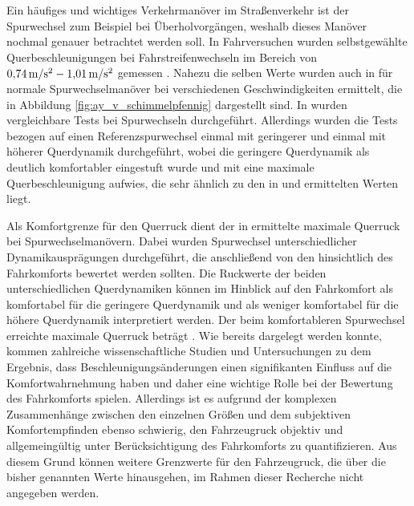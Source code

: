 Ein häufiges und wichtiges Verkehrmanöver im Straßenverkehr ist der Spurwechsel zum Beispiel bei Überholvorgängen, weshalb dieses Manöver nochmal genauer betrachtet werden soll. In Fahrversuchen wurden selbstgewählte Querbeschleunigungen bei Fahrstreifenwechseln im Bereich von $0{,}74\,\mathrm{m/s^2}-1{,}01\,\mathrm{m/s^2}$ gemessen \cite{Lange.2014}. Nahezu die selben Werte wurden auch in \cite{Schimmelpfennig.1985} für normale Spurwechselmanöver bei verschiedenen Geschwindigkeiten ermittelt, die in Abbildung \ref{fig:ay_v_schimmelpfennig} dargestellt sind. In \cite{WorkshopAssistenzsystemeFestner.2017} wurden vergleichbare Tests bei Spurwechseln durchgeführt. Allerdings wurden die Tests bezogen auf einen Referenzspurwechsel einmal mit geringerer und einmal mit höherer Querdynamik durchgeführt, wobei die geringere Querdynamik als deutlich komfortabler eingestuft wurde \cite{WorkshopAssistenzsystemeFestner.2017} und mit  eine maximale Querbeschleunigung aufwies, die sehr ähnlich zu den in \cite{Schimmelpfennig.1985} und \cite{Lange.2014} ermittelten Werten liegt. 

Als Komfortgrenze für den Querruck dient der in \cite{WorkshopAssistenzsystemeFestner.2017} ermittelte maximale Querruck bei Spurwechselmanövern. Dabei wurden Spurwechsel unterschiedlicher Dynamikausprägungen durchgeführt, die anschließend von den  hinsichtlich des Fahrkomforts bewertet werden sollten. Die Ruckwerte der beiden unterschiedlichen Querdynamiken können im Hinblick auf den Fahrkomfort als komfortabel für die geringere Querdynamik und als weniger komfortabel für die höhere Querdynamik interpretiert werden. Der beim komfortableren Spurwechsel erreichte maximale Querruck beträgt  \cite{WorkshopAssistenzsystemeFestner.2017}. Wie bereits dargelegt werden konnte, kommen zahlreiche wissenschaftliche Studien und Untersuchungen zu dem Ergebnis, dass Beschleunigungsänderungen einen signifikanten Einfluss auf die Komfortwahrnehmung haben und daher eine wichtige Rolle bei der Bewertung des Fahrkomforts spielen. Allerdings ist es aufgrund der komplexen Zusammenhänge zwischen den einzelnen Größen und dem subjektiven Komfortempfinden ebenso schwierig, den Fahrzeugruck objektiv und allgemeingültig unter Berücksichtigung des Fahrkomforts zu quantifizieren. Aus diesem Grund können weitere Grenzwerte für den Fahrzeugruck, die über die bisher genannten Werte hinausgehen, im Rahmen dieser Recherche nicht angegeben werden. 

